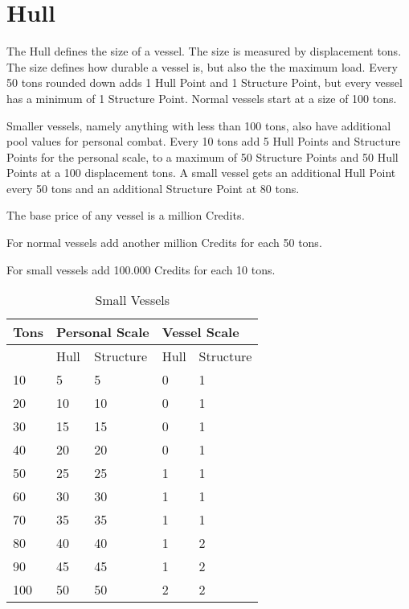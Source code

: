 \section{Hull}
\label{sec:Hull}

The Hull defines the size of a vessel. The size is measured by displacement tons. The size defines how durable a vessel is, but also the the maximum load. Every 50 tons rounded down adds 1 Hull Point and 1 Structure Point, but every vessel has a minimum of 1 Structure Point. Normal vessels start at a size of 100 tons.

Smaller vessels, namely anything with less than 100 tons, also have additional pool values for personal combat. Every 10 tons add 5 Hull Points and Structure Points for the personal scale, to a maximum of 50 Structure Points and 50 Hull Points at a 100 displacement tons.
A small vessel gets an additional Hull Point every 50 tons and an additional Structure Point at 80 tons.

The base price of any vessel is a million Credits.

For normal vessels add another million Credits for each 50 tons.

For small vessels add 100.000 Credits for each 10 tons.

\begin{table}[H]
  \centering
  \caption{Small Vessels}
  \begin{tabular}{|l|l|l|l|l|}
    \hline
    Tons & \multicolumn{2}{l|}{Personal Scale} & \multicolumn{2}{l|}{Vessel Scale} \\ \hline
    ~    & Hull           & Structure & Hull         & Structure \\ \hline
    10   & 5              & 5         & 0            & 1         \\ \hline
    20   & 10             & 10        & 0            & 1         \\ \hline
    30   & 15             & 15        & 0            & 1         \\ \hline
    40   & 20             & 20        & 0            & 1         \\ \hline
    50   & 25             & 25        & 1            & 1         \\ \hline
    60   & 30             & 30        & 1            & 1         \\ \hline
    70   & 35             & 35        & 1            & 1         \\ \hline
    80   & 40             & 40        & 1            & 2         \\ \hline
    90   & 45             & 45        & 1            & 2         \\ \hline
    100  & 50             & 50        & 2            & 2         \\ \hline
  \end{tabular}
\end{table}

